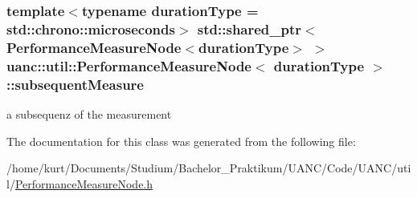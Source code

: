 \subsubsection[{\texorpdfstring{subsequent\+Measure}{subsequentMeasure}}]{\setlength{\rightskip}{0pt plus 5cm}template$<$typename duration\+Type  = std\+::chrono\+::microseconds$>$ std\+::shared\+\_\+ptr$<${\bf Performance\+Measure\+Node}$<$duration\+Type$>$ $>$ {\bf uanc\+::util\+::\+Performance\+Measure\+Node}$<$ duration\+Type $>$\+::subsequent\+Measure}\hypertarget{classuanc_1_1util_1_1_performance_measure_node_a48b59e75db03b65e2dc2dfd7bbdf05bb}{}\label{classuanc_1_1util_1_1_performance_measure_node_a48b59e75db03b65e2dc2dfd7bbdf05bb}
a subsequenz of the measurement 

The documentation for this class was generated from the following file\+:\begin{DoxyCompactItemize}
\item 
/home/kurt/\+Documents/\+Studium/\+Bachelor\+\_\+\+Praktikum/\+U\+A\+N\+C/\+Code/\+U\+A\+N\+C/util/\hyperlink{_performance_measure_node_8h}{Performance\+Measure\+Node.\+h}\end{DoxyCompactItemize}
